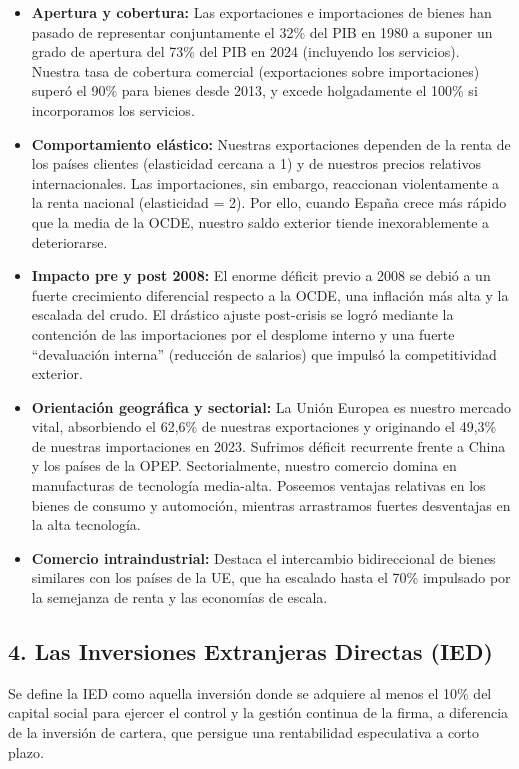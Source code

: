 \begin{itemize}
  \item \textbf{Apertura y cobertura:} Las exportaciones e importaciones de bienes han pasado de representar conjuntamente el 32\% del PIB en 1980 a suponer un grado de apertura del 73\% del PIB en 2024 (incluyendo los servicios). Nuestra tasa de cobertura comercial (exportaciones sobre importaciones) superó el 90\% para bienes desde 2013, y excede holgadamente el 100\% si incorporamos los servicios.
  \item \textbf{Comportamiento elástico:} Nuestras exportaciones dependen de la renta de los países clientes (elasticidad cercana a 1) y de nuestros precios relativos internacionales. Las importaciones, sin embargo, reaccionan violentamente a la renta nacional (elasticidad = 2). Por ello, cuando España crece más rápido que la media de la OCDE, nuestro saldo exterior tiende inexorablemente a deteriorarse.
  \item \textbf{Impacto pre y post 2008:} El enorme déficit previo a 2008 se debió a un fuerte crecimiento diferencial respecto a la OCDE, una inflación más alta y la escalada del crudo. El drástico ajuste post-crisis se logró mediante la contención de las importaciones por el desplome interno y una fuerte ``devaluación interna'' (reducción de salarios) que impulsó la competitividad exterior.
  \item \textbf{Orientación geográfica y sectorial:} La Unión Europea es nuestro mercado vital, absorbiendo el 62,6\% de nuestras exportaciones y originando el 49,3\% de nuestras importaciones en 2023. Sufrimos déficit recurrente frente a China y los países de la OPEP. Sectorialmente, nuestro comercio domina en manufacturas de tecnología media-alta. Poseemos ventajas relativas en los bienes de consumo y automoción, mientras arrastramos fuertes desventajas en la alta tecnología.
  \item \textbf{Comercio intraindustrial:} Destaca el intercambio bidireccional de bienes similares con los países de la UE, que ha escalado hasta el 70\% impulsado por la semejanza de renta y las economías de escala.
\end{itemize}

\subsection*{4. Las Inversiones Extranjeras Directas (IED)}

Se define la IED como aquella inversión donde se adquiere al menos el 10\% del capital social para ejercer el control y la gestión continua de la firma, a diferencia de la inversión de cartera, que persigue una rentabilidad especulativa a corto plazo.

